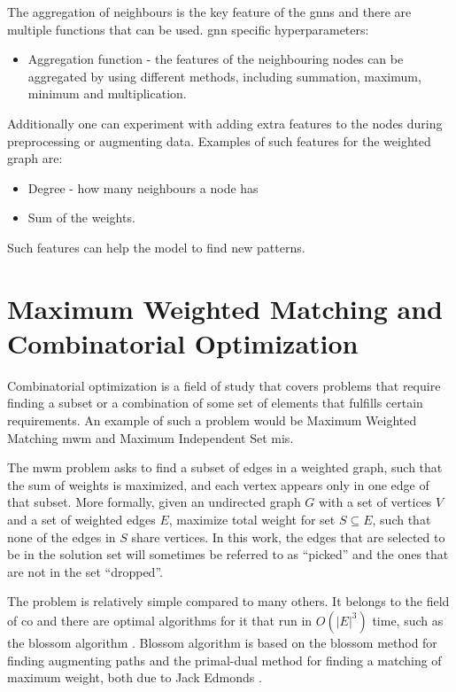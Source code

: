 The aggregation of neighbours is the key feature of the \gls{gnn}s and there are multiple functions that can be used.
\gls{gnn} specific hyperparameters:
\begin{itemize}
\item Aggregation function - the features of the neighbouring nodes can be aggregated by using different methods, including summation, maximum, minimum and multiplication.
\end{itemize}

Additionally one can experiment with adding extra features to the nodes during preprocessing or augmenting data. Examples of such features for the weighted graph are: 
\begin{itemize}
\item Degree - how many neighbours a node has
\item Sum of the weights. 
\end{itemize}
Such features can help the model to find new patterns.

\section{Maximum Weighted Matching and Combinatorial Optimization}

Combinatorial optimization is a field of study that covers problems that require finding a subset or a combination of some set of elements that fulfills certain requirements. An example of such a problem would be Maximum Weighted Matching \gls{mwm} and Maximum Independent Set \gls{mis}. 

The \gls{mwm} problem asks to find a subset of edges in a weighted graph, such that the sum of weights is maximized, and each vertex appears only in one edge of that subset. More formally, given an undirected graph $G$ with a set of vertices $V$ and a set of weighted edges $E$, maximize total weight for set $S \subseteq E$, such that none of the edges in $S$ share vertices. In this work, the edges that are selected to be in the solution set will sometimes be referred to as “picked” and the ones that are not in the set “dropped”.

The problem is relatively simple compared to many others. It belongs to the field of \gls{co} and there are optimal algorithms for it that run in $O(|E|^{3})$ time, such as the blossom algorithm \cite{blossom}. Blossom algorithm is based on the blossom method for finding augmenting paths and the primal-dual method for finding a matching of maximum weight, both due to Jack Edmonds \cite{blossom}.

